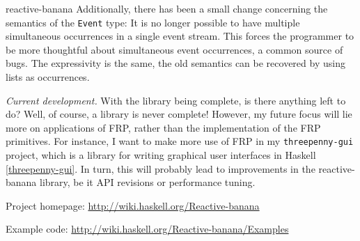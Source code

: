 \begin{hcarentry}[updated]{reactive-banana}
Additionally, there has been a small change concerning the semantics of the \verb!Event! type: It is no longer possible to have multiple simultaneous occurrences in a single event stream. This forces the programmer to be more thoughtful about simultaneous event occurrences, a common source of bugs. The expressivity is the same, the old semantics can be recovered by using lists as occurrences.

\emph{Current development.}
With the library being complete, is there anything left to do? Well, of course, a library is never complete! However, my future focus will lie more on applications of FRP, rather than the implementation of the FRP primitives. For instance, I want to make more use of FRP in my \verb`threepenny-gui` project, which is a library for writing graphical user interfaces in Haskell \cref{threepenny-gui}. In turn, this will probably lead to improvements in the reactive-banana library, be it API revisions or performance tuning.

\FurtherReading
\begin{compactitem}
\item Project homepage: \url{http://wiki.haskell.org/Reactive-banana}
\item Example code: \url{http://wiki.haskell.org/Reactive-banana/Examples}
\end{compactitem}
\end{hcarentry}
